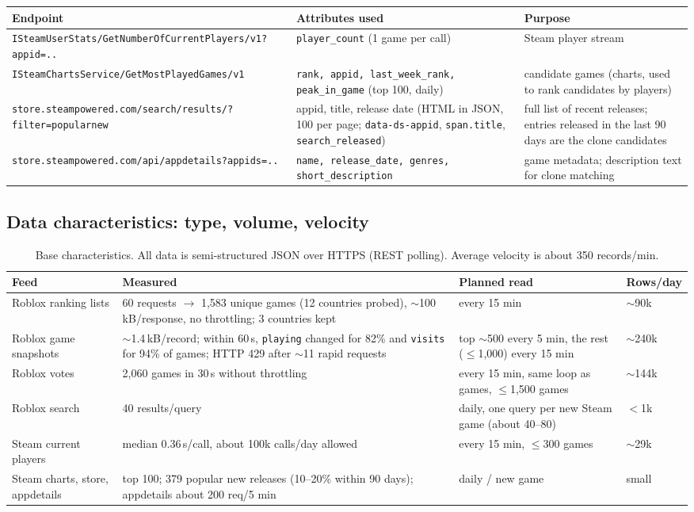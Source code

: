 \documentclass[10pt,a4paper]{article}
\newcommand{\ep}[1]{\texttt{\small #1}}
\newcommand{\eu}[1]{{\small\nolinkurl{#1}}}
\begin{document}
{\small
\begin{longtable}{L{4.4cm} L{5.9cm} L{5.4cm}}
\toprule
\textbf{Endpoint} & \textbf{Attributes used} & \textbf{Purpose}\\
\midrule\endhead
\eu{ISteamUserStats/GetNumberOfCurrentPlayers/v1?appid=..} & \ep{player\_count} (1 game per call) & Steam player stream\\
\eu{ISteamChartsService/GetMostPlayedGames/v1} & \ep{rank, appid, last\_week\_rank, peak\_in\_game} (top 100, daily) & candidate games (charts, used to rank candidates by players)\\
\eu{store.steampowered.com/search/results/?filter=popularnew} & appid, title, release date (HTML in JSON, 100 per page; \ep{data-ds-appid}, \ep{span.title}, \ep{search\_released}) & full list of recent releases; entries released in the last 90 days are the clone candidates\\
\eu{store.steampowered.com/api/appdetails?appids=..} & \ep{name, release\_date, genres, short\_description} & game metadata; description text for clone matching\\
\bottomrule
\end{longtable}}

\subsection{Data characteristics: type, volume, velocity}
\begin{table}[H]
\centering\small
\begin{tabularx}{\textwidth}{L{3.1cm} Y L{2.9cm} L{2.0cm}}
\toprule
\textbf{Feed} & \textbf{Measured} & \textbf{Planned read} & \textbf{Rows/day}\\
\midrule
Roblox ranking lists & 60 requests $\rightarrow$ 1,583 unique games (12 countries probed), $\sim$100\,kB/response, no throttling; 3 countries kept & every 15 min & $\sim$90k\\
Roblox game snapshots & $\sim$1.4\,kB/record; within 60\,s, \ep{playing} changed for 82\% and \ep{visits} for 94\% of games; HTTP 429 after $\sim$11 rapid requests & top $\sim$500 every 5 min, the rest ($\le$1,000) every 15 min & $\sim$240k\\
Roblox votes & 2,060 games in 30\,s without throttling & every 15 min, same loop as games, $\le$1,500 games & $\sim$144k\\
Roblox search & 40 results/query & daily, one query per new Steam game (about 40--80) & $<$1k\\
Steam current players & median 0.36\,s/call, about 100k calls/day allowed & every 15 min, $\le$300 games & $\sim$29k\\
Steam charts, store, appdetails & top 100; 379 popular new releases (10--20\% within 90 days); appdetails about 200 req/5 min & daily / new game & small\\
\bottomrule
\end{tabularx}
\caption{Base characteristics. All data is semi-structured JSON over HTTPS (REST polling). Average velocity is about 350 records/min.}
\end{table}
\end{document}
